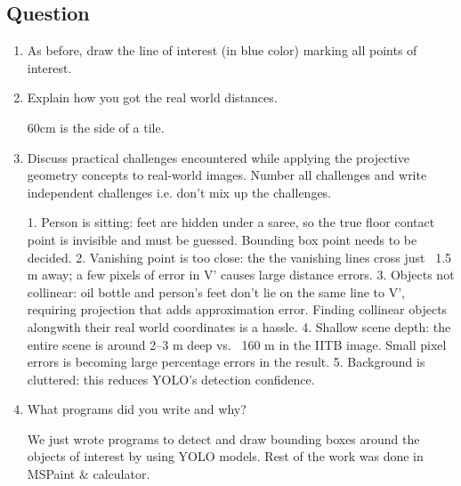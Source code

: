 \subsection{Question}
\begin{enumerate}

\item As before, draw the line of interest (in blue color) marking all points of interest. 
  
\item Explain how you got the real world distances.
\begin{studentSpace}
    \vspace{5cm}
    60cm is the side of a tile.
\end{studentSpace}

  
\item Discuss practical challenges encountered while applying the projective
geometry concepts to real-world images. Number all challenges and write independent challenges i.e. don't mix up the challenges.
\begin{studentSpace}
    \vspace{10cm}
    1. Person is sitting: feet are hidden under a saree, so the true floor contact point is invisible and must be guessed. Bounding box point needs to be decided.
    2. Vanishing point is too close: the the vanishing lines cross just ~1.5 m away; a few pixels of error in V' causes large distance errors.
    3. Objects not collinear: oil bottle and person's feet don't lie on the same line to V', requiring projection that adds approximation error. Finding collinear objects alongwith their real world coordinates is a hassle.
    4. Shallow scene depth: the entire scene is around 2–3 m deep vs. ~160 m in the IITB image. Small pixel errors is becoming large percentage errors in the result.
    5. Background is cluttered: this reduces YOLO’s detection confidence.
\end{studentSpace}


\item What programs did you write and why?  
\begin{studentSpace}
    \vspace{5cm}
    We just wrote programs to detect and draw bounding boxes around the objects of interest by using YOLO models. Rest of the work was done in MSPaint & calculator.
\end{studentSpace}


\end{enumerate}

